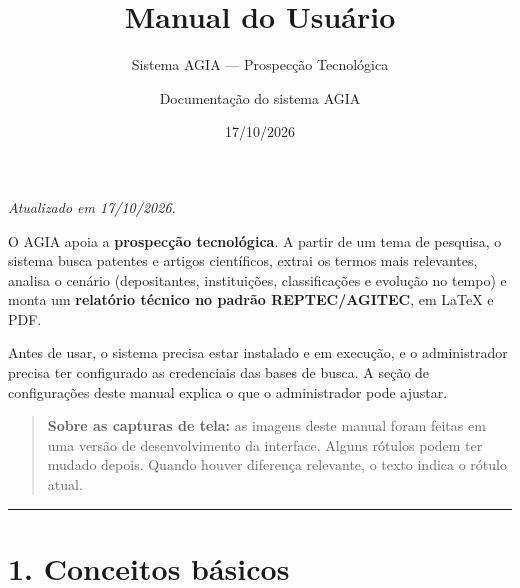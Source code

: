 \documentclass[
  brazilian,
  a4paper,12pt,oneside]{report}
\title{Manual do Usuário}
\subtitle{Sistema AGIA --- Prospecção Tecnológica}
\author{Documentação do sistema AGIA}
\date{17/10/2026}
\begin{document}
\maketitle

{
\setcounter{tocdepth}{1}
\tableofcontents
}
\emph{Atualizado em 17/10/2026.}

O AGIA apoia a \textbf{prospecção tecnológica}. A partir de um tema de
pesquisa, o sistema busca patentes e artigos científicos, extrai os
termos mais relevantes, analisa o cenário (depositantes, instituições,
classificações e evolução no tempo) e monta um \textbf{relatório técnico
no padrão REPTEC/AGITEC}, em LaTeX e PDF.

Antes de usar, o sistema precisa estar instalado e em execução, e o
administrador precisa ter configurado as credenciais das bases de busca.
A seção de configurações deste manual explica o que o administrador pode
ajustar.

\begin{quote}
\textbf{Sobre as capturas de tela:} as imagens deste manual foram feitas
em uma versão de desenvolvimento da interface. Alguns rótulos podem ter
mudado depois. Quando houver diferença relevante, o texto indica o
rótulo atual.
\end{quote}

\begin{center}\rule{0.5\linewidth}{0.5pt}\end{center}

\chapter{1. Conceitos básicos}\label{conceitos-buxe1sicos}
\end{document}
